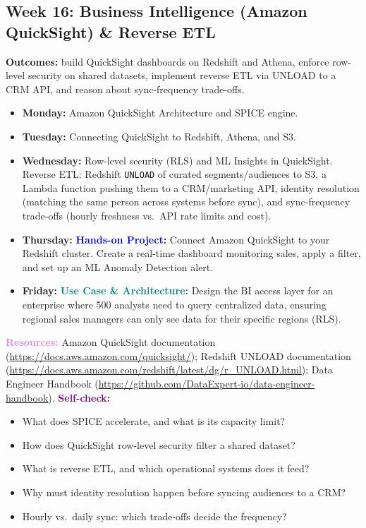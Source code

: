 \documentclass[11pt, a4paper]{article}
\newcommand{\project}[1]{\vspace{1mm}\noindent\textbf{\textcolor{blue}{Hands-on Project:}} #1}
\newcommand{\usecase}[1]{\vspace{1mm}\noindent\textbf{\textcolor{teal}{Use Case \& Architecture:}} #1}
\newcommand{\dayitem}[2]{\item \textbf{#1:} #2}
\newcommand{\resources}[1]{\vspace{1mm}\noindent\textbf{\textcolor{violet}{Resources:}} #1}
\newcommand{\selfcheck}[1]{\vspace{1mm}\noindent\textbf{\textcolor{purple}{Self-check:}} #1}
\begin{document}
\subsection*{Week 16: Business Intelligence (Amazon QuickSight) \& Reverse ETL}
\par\noindent\textbf{Outcomes:} build QuickSight dashboards on Redshift and Athena, enforce row-level security on shared datasets, implement reverse ETL via UNLOAD to a CRM API, and reason about sync-frequency trade-offs.
\begin{itemize}[label=-]
    \dayitem{Monday}{Amazon QuickSight Architecture and SPICE engine.}
    \dayitem{Tuesday}{Connecting QuickSight to Redshift, Athena, and S3.}
    \dayitem{Wednesday}{Row-level security (RLS) and ML Insights in QuickSight. Reverse ETL: Redshift \texttt{UNLOAD} of curated segments/audiences to S3, a Lambda function pushing them to a CRM/marketing API, identity resolution (matching the same person across systems before sync), and sync-frequency trade-offs (hourly freshness vs.\ API rate limits and cost).}
    \dayitem{Thursday}{\project{Connect Amazon QuickSight to your Redshift cluster. Create a real-time dashboard monitoring sales, apply a filter, and set up an ML Anomaly Detection alert.}}
    \dayitem{Friday}{\usecase{Design the BI access layer for an enterprise where 500 analysts need to query centralized data, ensuring regional sales managers can only see data for their specific regions (RLS).}}
\end{itemize}
\resources{Amazon QuickSight documentation (\url{https://docs.aws.amazon.com/quicksight/}); Redshift UNLOAD documentation (\url{https://docs.aws.amazon.com/redshift/latest/dg/r_UNLOAD.html}); Data Engineer Handbook (\url{https://github.com/DataExpert-io/data-engineer-handbook}).}
\selfcheck{\begin{itemize}[label=-, leftmargin=1.5em, itemsep=0pt]
    \item What does SPICE accelerate, and what is its capacity limit?
    \item How does QuickSight row-level security filter a shared dataset?
    \item What is reverse ETL, and which operational systems does it feed?
    \item Why must identity resolution happen before syncing audiences to a CRM?
    \item Hourly vs.\ daily sync: which trade-offs decide the frequency?
\end{itemize}}
\end{document}

